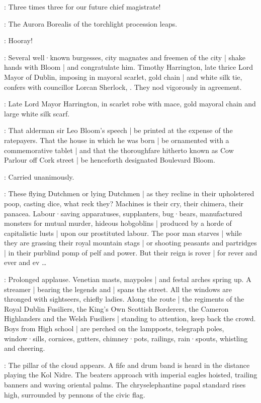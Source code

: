 \Elector:
Three times three for our future chief magistrate!

:
The Aurora Borealis of the torchlight procession leaps.

\Torchbearers:
Hooray!

:
Several well·known burgesses,
city magnates and freemen of the city |
shake hands with Bloom |
and congratulate him.
Timothy Harrington,
late thrice Lord Mayor of Dublin,
imposing in mayoral scarlet,
gold chain |
and white silk tie,
confers with councillor Lorcan Sherlock,
.
They nod vigorously in agreement.

:
Late Lord Mayor Harrington,
in scarlet robe with mace,
gold mayoral chain and large white silk scarf.

\Harrington:
That alderman sir Leo Bloom's speech |
be printed at the expense of the ratepayers.
That the house in which he was born |
be ornamented with a commemorative tablet |
and that the thoroughfare hitherto known as Cow Parlour off Cork street |
be henceforth designated Boulevard Bloom.

\Lorcan[2]:
Carried unanimously.

\Bloom:
These flying Dutchmen or lying Dutchmen |
as they recline in their upholstered poop,
casting dice,
what reck they?
Machines is their cry,
their chimera,
their panacea.
Labour·saving apparatuses,
supplanters,
bug·bears,
manufactured monsters for mutual murder,
hideous hobgoblins |
produced by a horde of capitalistic lusts |
upon our prostituted labour.
The poor man starves |
while they are grassing their royal mountain stags |
or shooting peasants and partridges |
in their purblind pomp of pelf and power.
But their reign is rover |
for rever and ever and ev \ldots

:
Prolonged applause.
Venetian masts,
maypoles |
and festal arches spring up.
A streamer |
bearing the legends 
and  |
spans the street.
All the windows are thronged with sightseers,
chiefly ladies.
Along the route |
the regiments of the Royal Dublin Fusiliers,
the King's Own Scottish Borderers,
the Cameron Highlanders
and the Welsh Fusiliers |
standing to attention,
keep back the crowd.
Boys from High school |
are perched on the lampposts,
telegraph poles,
window·sills,
cornices,
gutters,
chimney·pots,
railings,
rain·spouts,
whistling and cheering.

:
The pillar of the cloud appears.
A fife and drum band is heard in the distance playing the Kol Nidre.
The beaters approach with imperial eagles hoisted,
trailing banners and waving oriental palms.
The chryselephantine papal standard rises high,
surrounded by pennons of the civic flag.


